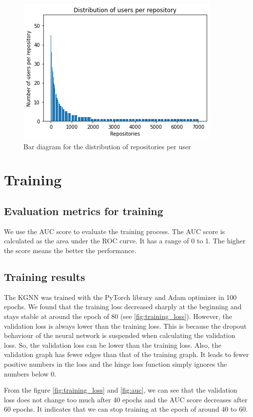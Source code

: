 \documentclass[11pt,twoside]{report}
\begin{document}
\begin{figure}[H]
    \centering
    \includegraphics[scale=0.9]{user_repo_dist_bar.png}
    \caption{Bar diagram for the distribution of repositories per user}
    \label{fig:user_repo_dist_bar}
\end{figure}

\section{Training}
\subsection{Evaluation metrics for training}
We use the AUC score to evaluate the training process. The AUC score is calculated as the area under the ROC curve. It has a range of 0 to 1. The higher the score means the better the performance.

\subsection{Training results}
The KGNN was trained with the PyTorch library and Adam optimizer in 100 epochs. We found that the training loss decreased sharply at the beginning and stays stable at around the epoch of 80 (see \ref{fig:training_loss}). However, the validation loss is always lower than the training loss. This is because the dropout behaviour of the neural network is suspended when calculating the validation loss. So, the validation loss can be lower than the training loss. Also, the validation graph has fewer edges than that of the training graph. It leads to fewer positive numbers in the loss and the hinge loss function simply ignores the numbers below 0. 

From the figure \ref{fig:training_loss} and \ref{fig:auc}, we can see that the validation loss does not change too much after 40 epochs and the AUC score decreases after 60 epochs. It indicates that we can stop training at the epoch of around 40 to 60.
\end{document}
